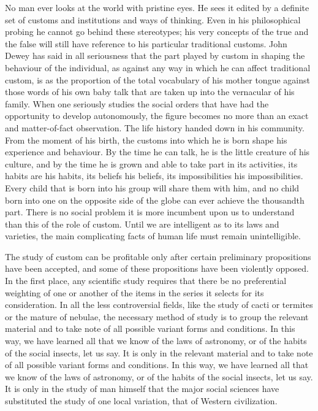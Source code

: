 \documentclass[11pt]{article}
\begin{document}
No man ever looks at the world with pristine eyes. He sees it edited by a definite set of customs and institutions and ways of thinking. Even in his philosophical probing he cannot go behind these stereotypes; his very concepts of the true and the false will still have reference to his particular traditional customs. John Dewey has said in all seriousness that the part played by custom in shaping the behaviour of the individual, as against any way in which he can affect traditional custom, is as the proportion of the total vocabulary of his mother tongue against those words of his own baby talk that are taken up into the vernacular of his family. When one seriously studies the social orders that have had the opportunity to develop autonomously, the figure becomes no more than an exact and matter-of-fact observation. The life history handed down in his community. From the moment of his birth, the customs into which he is born shape his experience and behaviour. By the time he can talk, he is the little creature of his culture, and by the time he is grown and able to take part in its activities, its habits are his habits, its beliefs his beliefs, its impossibilities his impossibilities. Every child that is born into his group will share them with him, and no child born into one on the opposite side of the globe can ever achieve the thousandth part. There is no social problem it is more incumbent upon us to understand than this of the role of custom. Until we are intelligent as to its laws and varieties, the main complicating facts of human life must remain unintelligible.

The study of custom can be profitable only after certain preliminary propositions have been accepted, and some of these propositions have been violently opposed. In the first place, any scientific study requires that there be no preferential weighting of one or another of the items in the series it selects for its consideration. In all the less controversial fields, like the study of cacti or termites or the mature of nebulae, the necessary method of study is to group the relevant material and to take note of all possible variant forms and conditions. In this way, we have learned all that we know of the laws of astronomy, or of the habits of the social insects, let us say. It is only in the relevant material and to take note of all possible variant forms and conditions. In this way, we have learned all that we know of the laws of astronomy, or of the habits of the social insects, let us say. It is only in the study of man himself that the major social sciences have substituted the study of one local variation, that of Western civilization.
\end{document}
